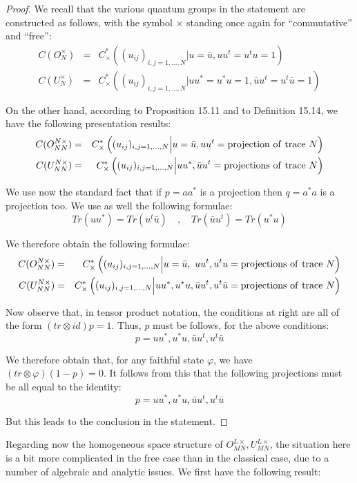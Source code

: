 \documentclass[12pt]{amsbook}
\begin{document}
\begin{proof}
We recall that the various quantum groups in the statement are constructed as follows, with the symbol $\times$ standing once again for ``commutative'' and ``free'':
\begin{eqnarray*}
C(O_N^\times)&=&C^*_\times\left((u_{ij})_{i,j=1,\ldots,N}\Big|u=\bar{u},uu^t=u^tu=1\right)\\
C(U_N^\times)&=&C^*_\times\left((u_{ij})_{i,j=1,\ldots,N}\Big|uu^*=u^*u=1,\bar{u}u^t=u^t\bar{u}=1\right)
\end{eqnarray*}

On the other hand, according to Proposition 15.11 and to Definition 15.14, we have the following presentation results:
\begin{eqnarray*}
C(O_{NN}^{N\times})&=&C^*_\times\left((u_{ij})_{i,j=1,\ldots,N}\Big|u=\bar{u},uu^t={\rm projection\ of\ trace}\ N\right)\\
C(U_{NN}^{N\times})&=&C^*_\times\left((u_{ij})_{i,j=1,\ldots,N}\Big|uu^*,\bar{u}u^t={\rm projections\ of\ trace}\ N\right)
\end{eqnarray*}

We use now the standard fact that if $p=aa^*$ is a projection then $q=a^*a$ is a projection too. We use as well the following formulae:
$$Tr(uu^*)=Tr(u^t\bar{u})\quad,\quad 
Tr(\bar{u}u^t)=Tr(u^*u)$$

We therefore obtain the following formulae:
\begin{eqnarray*}
C(O_{NN}^{N\times})&=&C^*_\times\left((u_{ij})_{i,j=1,\ldots,N}\Big|u=\bar{u},\ uu^t,u^tu={\rm projections\ of\ trace}\ N\right)\\
C(U_{NN}^{N\times})&=&C^*_\times\left((u_{ij})_{i,j=1,\ldots,N}\Big|uu^*,u^*u,\bar{u}u^t,u^t\bar{u}={\rm projections\ of\ trace}\ N\right)
\end{eqnarray*}

Now observe that, in tensor product notation, the conditions at right are all of the form $(tr\otimes id)p=1$. Thus, $p$ must be follows, for the above conditions:
$$p=uu^*,u^*u,\bar{u}u^t,u^t\bar{u}$$

We therefore obtain that, for any faithful state $\varphi$, we have $(tr\otimes\varphi)(1-p)=0$. It follows from this that the following projections must be all equal to the identity:
$$p=uu^*,u^*u,\bar{u}u^t,u^t\bar{u}$$

But this leads to the conclusion in the statement.
\end{proof}

Regarding now the homogeneous space structure of $O_{MN}^{L\times},U_{MN}^{L\times}$, the situation here is a bit more complicated in the free case than in the classical case, due to a number of algebraic and analytic issues. We first have the following result:
\end{document}
